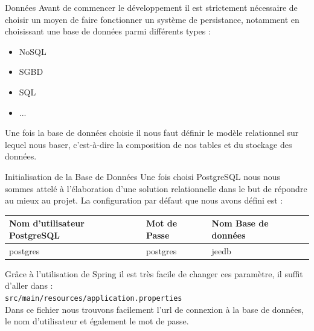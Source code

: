 \documentclass[a4paper]{article}
\makeatletter
\renewcommand{\section}{\@startsection{section}{1}{\z@}
{-4ex \@plus -1ex \@minus -.4ex}
{1ex \@plus.2ex }
{\normalfont\large\sffamily\bfseries}}
\renewcommand{\subsection}{\@startsection {subsection}{2}{\z@}
{-3ex \@plus -0.1ex \@minus -.4ex}
{0.5ex \@plus.2ex }
{\normalfont\sffamily\bfseries}}
\renewcommand{\arraystretch}{1.5}
\makeatother
\begin{document}
\section{Données}
Avant de commencer le développement il est strictement nécessaire de choisir un moyen de faire fonctionner un système de persistance, notamment en choisissant une base de données parmi différents types :
\begin{itemize}
\item NoSQL
\item SGBD
\item SQL
\item ...
\end{itemize}
\vspace*{0.5cm}
Une fois la base de données choisie il nous faut définir le modèle relationnel sur lequel nous baser, c'est-à-dire la composition de nos tables et du stockage des données.


\subsection{Initialisation de la Base de Données}
Une fois choisi PostgreSQL nous nous sommes attelé à l'élaboration d'une solution relationnelle dans le but de répondre au mieux au projet. La configuration par défaut que nous avons défini est :

\begin{table}[h]
	\centering
	\def\arraystretch{1.4}
	\begin{tabular}{|l|l|l|}
		\hline
		Nom d'utilisateur PostgreSQL & Mot de Passe & Nom Base de données\\
		\hline
		postgres & postgres & jeedb\\
	  \hline
	\end{tabular}
\end{table}

Grâce à l'utilisation de Spring il est très facile de changer ces paramètre, il suffit d'aller dans :\\
\texttt{src/main/resources/application.properties}\\
Dans ce fichier nous trouvons facilement l'url de connexion à la base de données, le nom d'utilisateur et également le mot de passe.
\end{document}
